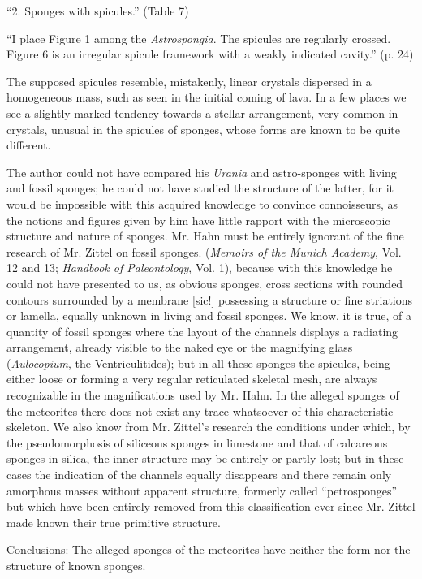 \documentclass[a4paper, 12pt, oneside]{article}
\begin{document}
``2. Sponges with spicules.'' (Table 7)

``I place Figure 1 among the \emph{Astrospongia}. The spicules are regularly crossed. Figure 6 is an irregular spicule framework with a weakly indicated cavity.'' (p. 24)

The supposed spicules resemble, mistakenly, linear crystals dispersed in a homogeneous mass, such as seen in the initial coming of lava. In a few places we see a slightly marked tendency towards a stellar arrangement, very common in crystals, unusual in the spicules of sponges, whose forms are known to be quite different.

The author could not have compared his \emph{Urania} and astro-sponges with living and fossil sponges; he could not have studied the structure of the latter, for it would be impossible with this acquired knowledge to convince connoisseurs, as the notions and figures given by him have little rapport with the microscopic structure and nature of sponges. Mr. Hahn must be entirely ignorant of the fine research of Mr. Zittel on fossil sponges. (\emph{Memoirs of the Munich Academy}, Vol. 12 and 13; \emph{Handbook of Paleontology}, Vol. 1), because with this knowledge he could not have presented to us, as obvious sponges, cross sections with rounded contours surrounded by a membrane [sic!] possessing a structure or fine striations or lamella, equally unknown in living and fossil sponges. We know, it is true, of a quantity of fossil sponges where the layout of the channels displays a radiating arrangement, already visible to the naked eye or the magnifying glass (\emph{Aulocopium}, the Ventriculitides); but in all these sponges the spicules, being either loose or forming a very regular reticulated skeletal mesh, are always recognizable in the magnifications used by Mr. Hahn. In the alleged sponges of the meteorites there does not exist any trace whatsoever of this characteristic skeleton. We also know from Mr. Zittel's research the conditions under which, by the pseudomorphosis of siliceous sponges in limestone and that of calcareous sponges in silica, the inner structure may be entirely or partly lost; but in these cases the indication of the channels equally disappears and there remain only amorphous masses without apparent structure, formerly called ``petrosponges'' but which have been entirely removed from this classification ever since Mr. Zittel made known their true primitive structure.

Conclusions: The alleged sponges of the meteorites have neither the form nor the structure of known sponges.
\end{document}
